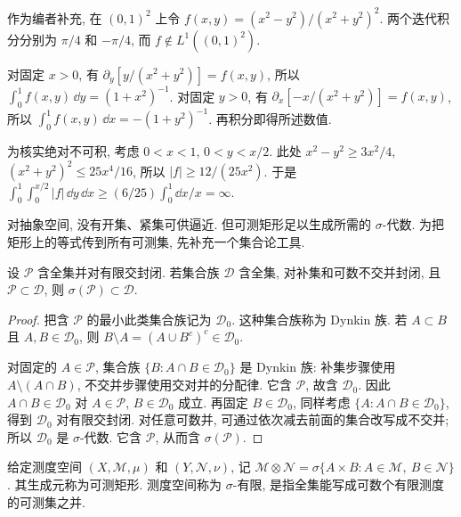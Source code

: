 \begin{example}\label{ra:c6:conditional}
作为编者补充, 在 $(0,1)^2$ 上令 $f(x,y)=(x^2-y^2)/(x^2+y^2)^2$. 两个迭代积分分别为 $\pi/4$ 和 $-\pi/4$, 而 $f\notin L^1((0,1)^2)$.
\end{example}
\begin{solution}
对固定 $x>0$, 有 $\partial_y[y/(x^2+y^2)]=f(x,y)$, 所以 $\int_0^1f(x,y)\,\dd y=(1+x^2)^{-1}$. 对固定 $y>0$, 有 $\partial_x[-x/(x^2+y^2)]=f(x,y)$, 所以 $\int_0^1f(x,y)\,\dd x=-(1+y^2)^{-1}$. 再积分即得所述数值.

为核实绝对不可积, 考虑 $0<x<1$, $0<y<x/2$. 此处 $x^2-y^2\ge3x^2/4$, $(x^2+y^2)^2\le25x^4/16$, 所以 $|f|\ge12/(25x^2)$. 于是
$\int_0^1\int_0^{x/2}|f|\,\dd y\,\dd x\ge(6/25)\int_0^1\dd x/x=\infty$.
\end{solution}


对抽象空间, 没有开集、紧集可供逼近. 但可测矩形足以生成所需的 $\sigma$-代数. 为把矩形上的等式传到所有可测集, 先补充一个集合论工具.

\begin{lemma}\label{ra:c6:pi-lambda}
设 $\mathcal P$ 含全集并对有限交封闭. 若集合族 $\mathcal D$ 含全集, 对补集和可数不交并封闭, 且 $\mathcal P\subset\mathcal D$, 则 $\sigma(\mathcal P)\subset\mathcal D$.
\end{lemma}
\begin{proof}
把含 $\mathcal P$ 的最小此类集合族记为 $\mathcal D_0$. 这种集合族称为 Dynkin 族. 若 $A\subset B$ 且 $A,B\in\mathcal D_0$, 则 $B\setminus A=(A\cup B^c)^c\in\mathcal D_0$.

对固定的 $A\in\mathcal P$, 集合族 $\{B:A\cap B\in\mathcal D_0\}$ 是 Dynkin 族: 补集步骤使用 $A\setminus(A\cap B)$, 不交并步骤使用交对并的分配律. 它含 $\mathcal P$, 故含 $\mathcal D_0$. 因此 $A\cap B\in\mathcal D_0$ 对 $A\in\mathcal P$, $B\in\mathcal D_0$ 成立. 再固定 $B\in\mathcal D_0$, 同样考虑 $\{A:A\cap B\in\mathcal D_0\}$, 得到 $\mathcal D_0$ 对有限交封闭. 对任意可数并, 可通过依次减去前面的集合改写成不交并; 所以 $\mathcal D_0$ 是 $\sigma$-代数. 它含 $\mathcal P$, 从而含 $\sigma(\mathcal P)$.
\end{proof}

\begin{definition}[乘积 $\sigma$-代数]
给定测度空间 $(X,\mathcal M,\mu)$ 和 $(Y,\mathcal N,\nu)$, 记
$\mathcal M\otimes\mathcal N=\sigma\{A\times B:A\in\mathcal M,\ B\in\mathcal N\}$.
其生成元称为可测矩形. 测度空间称为 $\sigma$-有限, 是指全集能写成可数个有限测度的可测集之并.
\end{definition}


